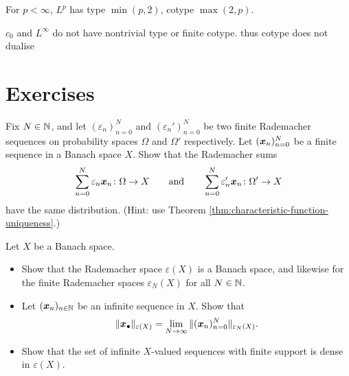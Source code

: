 \begin{example}
  {\color{blue} For $p < \infty$, $L^p$ has type $\min(p,2)$, cotype $\max(2,p)$.}
\end{example}

\begin{example}
  {\color{blue} $c_0$ and $L^\infty$ do not have nontrivial type or finite cotype}. thus cotype does not dualise
\end{example}



\section*{Exercises}

\begin{exercise}\label{ex:rad-sum-dist}
  Fix $N \in \mathbb{N}$, and let $(\varepsilon_{n})_{n=0}^{N}$ and $(\varepsilon_{n}')_{n=0}^{N}$ be two finite Rademacher sequences on probability spaces $\Omega$ and $\Omega'$ respectively.
  Let $(\bm{x}_{n})_{n=0}^{N}$ be a finite sequence in a Banach space $X$.
  Show that the Rademacher sums
  \begin{equation*}
    \sum_{n = 0}^{N} \varepsilon_n \bm{x}_{n} \colon \Omega \to X \qquad \text{and} \qquad
    \sum_{n = 0}^{N} \varepsilon_n' \bm{x}_{n} \colon \Omega' \to X
  \end{equation*}
  have the same distribution.
  (Hint: use Theorem \ref{thm:characteristic-function-uniqueness}.) 
\end{exercise}

\begin{exercise}\label{ex:on-rad-spaces}
  Let $X$ be a Banach space.
  \begin{itemize}
  \item
    Show that the Rademacher space $\varepsilon(X)$ is a Banach space, and likewise for the finite Rademacher spaces $\varepsilon_{N}(X)$ for all $N \in \mathbb{N}$.
  \item
    Let $(\bm{x}_{n})_{n \in \mathbb{N}}$ be an infinite sequence in $X$.
    Show that
    \begin{equation*}
      \|\bm{x}_{\bullet}\|_{\varepsilon(X)} = \lim_{N \to \infty} \|(\bm{x}_{n})_{n=0}^{N}\|_{\varepsilon_{N}(X)}.
    \end{equation*}
  \item
    Show that the set of infinite $X$-valued sequences with finite support is dense in $\varepsilon(X)$.
  \end{itemize}
\end{exercise}

